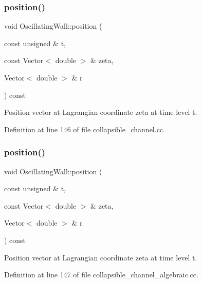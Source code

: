 \subsubsection{\texorpdfstring{position()}{position()}\hspace{0.1cm}{\footnotesize\ttfamily [1/4]}}
{\footnotesize\ttfamily void Oscillating\+Wall\+::position (\begin{DoxyParamCaption}\item[{const unsigned \&}]{t,  }\item[{const Vector$<$ double $>$ \&}]{zeta,  }\item[{Vector$<$ double $>$ \&}]{r }\end{DoxyParamCaption}) const\hspace{0.3cm}{\ttfamily [inline]}}



Position vector at Lagrangian coordinate zeta at time level t. 



Definition at line 146 of file collapsible\+\_\+channel.\+cc.

\mbox{\label{classOscillatingWall_abb4ae7e556479d2980a56963bd8d4558}} 
\subsubsection{\texorpdfstring{position()}{position()}\hspace{0.1cm}{\footnotesize\ttfamily [2/4]}}
{\footnotesize\ttfamily void Oscillating\+Wall\+::position (\begin{DoxyParamCaption}\item[{const unsigned \&}]{t,  }\item[{const Vector$<$ double $>$ \&}]{zeta,  }\item[{Vector$<$ double $>$ \&}]{r }\end{DoxyParamCaption}) const\hspace{0.3cm}{\ttfamily [inline]}}



Position vector at Lagrangian coordinate zeta at time level t. 



Definition at line 147 of file collapsible\+\_\+channel\+\_\+algebraic.\+cc.

\mbox{\label{classOscillatingWall_a5fce6728f975003d9e85f64c18ba7f55}} 
